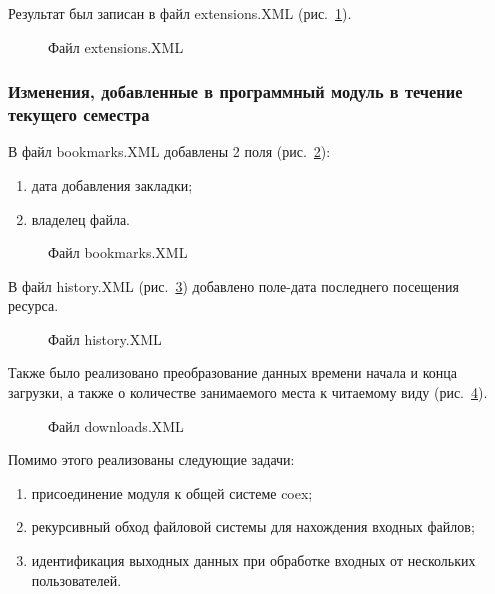 Результат был записан в файл extensions.XML (рис.~\ref{ship_8:ship_8}).


\begin{figure}[h!]
\caption{Файл extensions.XML}
\label{ship_8:ship_8}
\end{figure}

\subsubsection{Изменения, добавленные в программный модуль в течение текущего семестра}

В файл bookmarks.XML добавлены 2 поля (рис.~\ref{ship_9:ship_9}):

\begin{enumerate}
  \item дата добавления закладки;
  \item владелец файла.
\end{enumerate}

\begin{figure}[h!]
\caption{Файл bookmarks.XML}
\label{ship_9:ship_9}
\end{figure}

В файл history.XML (рис.~\ref{ship_10:ship_10}) добавлено поле-дата последнего посещения ресурса.

\begin{figure}[h!]
\caption{Файл history.XML}
\label{ship_10:ship_10}
\end{figure}

Также было реализовано преобразование данных времени начала и конца загрузки, а также о количестве занимаемого места к читаемому виду (рис.~\ref{ship_11:ship_11}).

\begin{figure}[h!]
\caption{Файл downloads.XML}
\label{ship_11:ship_11}
\end{figure}

\clearpage
Помимо этого реализованы следующие задачи:

\begin{enumerate}
  \item присоединение модуля к общей системе coex;
  \item рекурсивный обход файловой системы для нахождения входных файлов;
  \item идентификация выходных данных при обработке входных от нескольких пользователей.
\end{enumerate}

